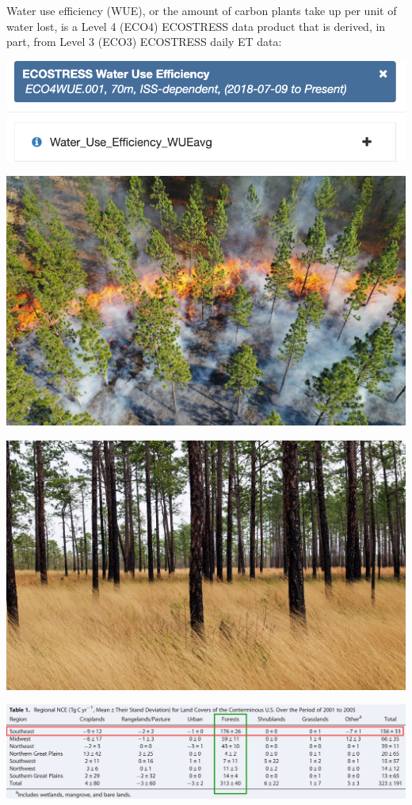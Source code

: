 \documentclass[oneside,a4paper,11pt,explicit]{book}
\begin{document}
Water use efficiency (WUE), or the amount of carbon plants take up per unit of water lost, is a Level 4 (ECO4) ECOSTRESS data product that is derived, in part, from Level 3 (ECO3) ECOSTRESS daily ET data:

\vspace{.5em}

\centerline{\includegraphics[width=.6\textwidth]{WUEecostress.png}}

\begin{tcolorbox}[colback=yellow!5!white,colframe=IceCreamLeaf,title=\textbf{Today's Study System: Southern Pine Forests}]
	\begin{multicols}{2}

	\centerline{\includegraphics[width=.975\columnwidth]{SPineBurn.jpeg}}
	\centerline{\includegraphics[width=.975\columnwidth]{SPineGrass.jpg}}
	\centerline{\includegraphics[width=.975\columnwidth]{CarbonForestUSRegions.png}}


\end{multicols}
\end{tcolorbox}
\end{document}
